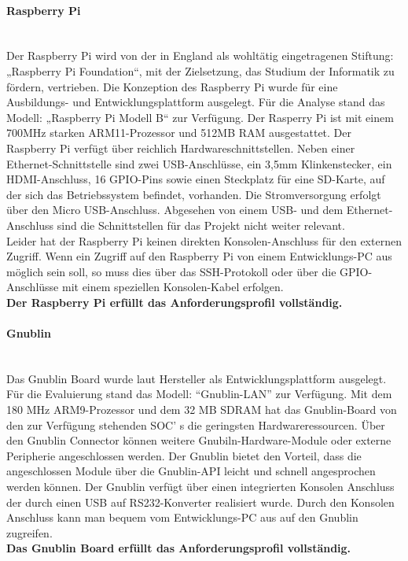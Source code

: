 \documentclass[../Bachelorarbeit.tex]{subfiles}
\begin{document}
\paragraph{Raspberry Pi}\mbox{}\\
\label{para:raspberry_pi} 
Der Raspberry Pi wird von der in England als wohltätig eingetragenen Stiftung: „Raspberry
Pi Foundation“, mit der Zielsetzung, das Studium der Informatik zu fördern, vertrieben.
Die
Konzeption des Raspberry Pi wurde für eine Ausbildungs- und Entwicklungsplattform 
ausgelegt. Für die Analyse stand das Modell: „Raspberry Pi Modell B“ zur Verfügung. Der 
Rasperry Pi ist mit einem 700MHz starken \acs{ARM}11-Prozessor und 512MB RAM 
ausgestattet. Der Raspberry Pi verfügt über reichlich Hardwareschnittstellen. Neben 
einer Ethernet-Schnittstelle sind zwei USB-Anschlüsse, ein 3,5mm Klinkenstecker, 
ein HDMI-Anschluss, 16 \ac{GPIO}-Pins sowie einen Steckplatz für eine SD-Karte, auf der sich
das Betriebssystem befindet, vorhanden. Die Stromversorgung erfolgt über den Micro USB-Anschluss.
Abgesehen von einem USB- und dem Ethernet-Anschluss sind die Schnittstellen für das 
Projekt nicht weiter relevant. \\
Leider hat der Raspberry Pi keinen direkten Konsolen-Anschluss für den externen Zugriff. 
Wenn ein Zugriff auf den Raspberry Pi von einem Entwicklungs-PC aus möglich sein soll, 
so muss dies über das \ac{SSH}-Protokoll oder über die \ac{GPIO}-Anschlüsse mit einem 
speziellen Konsolen-Kabel erfolgen. \parencites[vgl.][]{raspberryPi_about}[und][]{raspberryPi_faq}\\
\textbf{Der Raspberry Pi erfüllt das Anforderungsprofil vollständig.}

\paragraph{Gnublin}\mbox{}\\
\label{para:gnublin} 
Das Gnublin Board wurde laut Hersteller als Entwicklungsplattform ausgelegt. Für die 
Evaluierung stand das Modell: "`Gnublin-LAN"' zur Verfügung. Mit dem 180 MHz \ac{ARM}9-Prozessor und dem 32 MB \ac{SDRAM} hat das Gnublin-Board von den zur Verfügung 
stehenden \ac{SOC}' s die geringsten Hardwareressourcen. Über den Gnublin Connector 
können weitere Gnubiln-Hardware-Module oder externe Peripherie angeschlossen werden. 
Der Gnublin bietet den Vorteil, dass die angeschlossen Module über die Gnublin-\acs{API} leicht und schnell angesprochen werden können. 
Der Gnublin verfügt über einen integrierten Konsolen Anschluss der durch einen USB auf RS232-Konverter realisiert wurde. 
Durch den Konsolen Anschluss kann man bequem vom Entwicklungs-PC aus auf den Gnublin zugreifen. 
\parencite[vgl.][]{gnublin_details}\\
\textbf{Das Gnublin Board erfüllt das Anforderungsprofil vollständig.}
\end{document}
